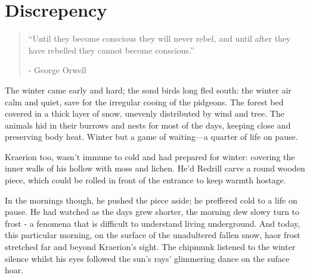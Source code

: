 \chapter{Discrepency}

\vspace{-1.3cm}
\begin{localsize}{10}
	\begin{quote}
    “Until they become conscious they will never rebel, and until after they have rebelled they cannot become conscious.”
		\begin{flushright}- George Orwell \end{flushright}
	\end{quote} 
\end{localsize}
\vspace{1cm}





The winter came early and hard; the sond birds long fled south: the winter air calm and quiet, save for the irregular cooing of the pidgeons. The forest bed covered in a thick layer of snow, unevenly distributed by wind and tree. The animals hid in their burrows and nests for most of the days, keeping close and preserving body heat. Winter but a game of waiting—a quarter of life on pause.

Kraerion too, wasn't immune to cold and had prepared for winter: covering the inner walls of his hollow with moss and lichen. He'd Redrill carve a round wooden piece, which could be rolled in front of the entrance to keep warmth hostage.

In the mornings though, he pushed the piece aside; he preffered cold to a life on pause. He had watched as the days grew shorter, the morning dew slowy turn to frost - a fenomena that is difficult to understand living underground. And today, this particular morning, on the surface of the unadultered fallen snow, haor frost stretched far and beyond Kraerion's sight. The chipmunk listened to the winter silence whilst his eyes followed the sun's rays' glimmering dance on the suface hoar.

